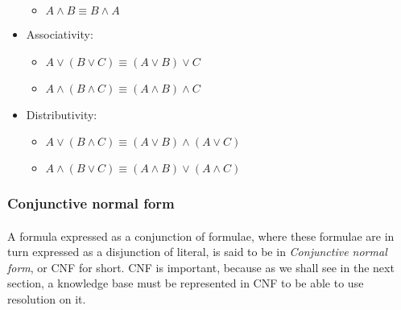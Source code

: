 \documentclass[part1.tex]{subfiles}
\begin{document}
\begin{itemize}
\begin{itemize}
    \item $A \wedge B \equiv B \wedge A$
  \end{itemize}
\item Associativity:
  \begin{itemize}
    \item $A \vee (B \vee C) \equiv (A \vee B) \vee C$
    \item $A \wedge (B \wedge C) \equiv (A \wedge B) \wedge C$
  \end{itemize}
\item Distributivity:
  \begin{itemize}
    \item $A \vee (B \wedge C) \equiv (A \vee B) \wedge (A \vee
      C)$
    \item $A \wedge (B \vee C) \equiv (A \wedge B) \vee (A \wedge
      C)$
  \end{itemize}
\end{itemize}
\subsubsection{Conjunctive normal form}
\paragraph{} A formula expressed as a conjunction of formulae, where these formulae are in turn expressed as
a disjunction of literal, is said to be in {\em Conjunctive
normal form}, or CNF for short. CNF is important, because as we
shall see in the next section, a knowledge base must be represented in CNF to be able
to use resolution on it.
\end{document}

